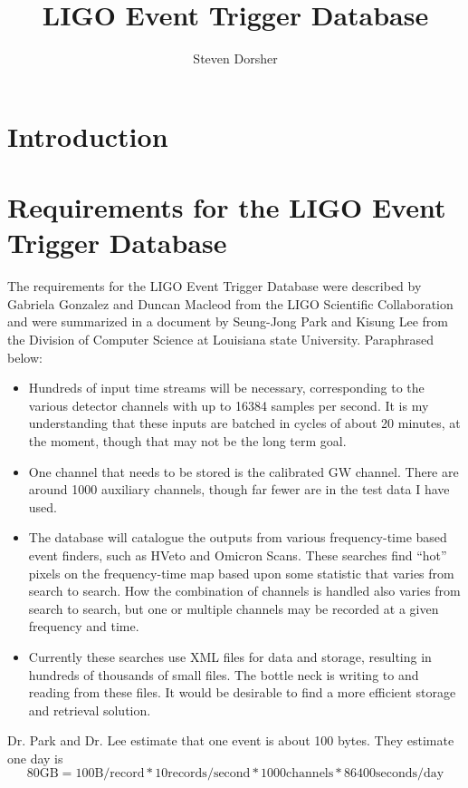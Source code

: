 \documentclass{article}
\begin{document}
\title{LIGO Event Trigger Database}
\author{Steven Dorsher}

\maketitle

\section{Introduction}


\section{Requirements for the LIGO Event Trigger Database}
The requirements for the LIGO Event Trigger Database were described by
Gabriela Gonzalez and Duncan Macleod from the LIGO Scientific
Collaboration and were summarized in a document by Seung-Jong Park and
Kisung Lee from the Division of Computer Science at Louisiana state
University. Paraphrased below:
\begin{itemize}
  \item Hundreds of input time streams will be necessary,
    corresponding to the various detector channels with up to 16384
    samples per second. It is my understanding that these inputs are
    batched in cycles of about 20 minutes, at the moment, though that
    may not be the long term goal.
  \item One channel that needs to be stored is the calibrated GW
    channel. There are around 1000 auxiliary channels, though far
    fewer are in the test data I have used.
  \item The database will catalogue the outputs from various
    frequency-time based event finders, such as HVeto and Omicron
    Scans. These searches find ``hot'' pixels on the frequency-time
    map based upon some statistic that varies from search to
    search. How the combination of channels is handled also varies
    from search to search, but one or multiple channels may be
    recorded at a given frequency and time.
  \item Currently these searches use XML files for data and storage,
    resulting in hundreds of thousands of small files. The bottle neck
    is writing to and reading from these files. It would be desirable
    to find a more efficient storage and retrieval solution.
\end{itemize}

Dr. Park and Dr. Lee estimate that one event is about 100 bytes. They estimate one day is
\begin{equation}
  80 \text{GB}= 100 \text{B}/\text{record} * 10 \text{records}/\text{second} * 1000 \text{channels} * 86400 \text{seconds}/\text{day}
\end{equation}
\end{document}
